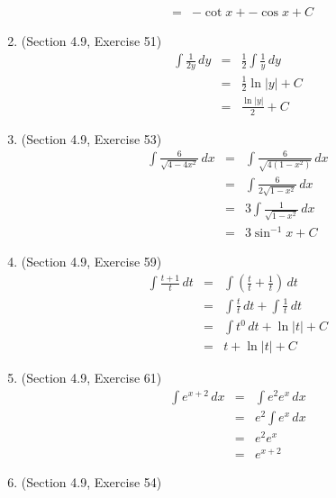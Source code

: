 \documentclass{article}
\begin{document}
\begin{enumerate}
\begin{eqnarray}
                                                    &=& -\cot{x} + -\cos{x} + C
        \end{eqnarray}
    \item (Section 4.9, Exercise 51)
        \begin{eqnarray}
            \int{\frac{1}{2y}}\,dy &=& \frac{1}{2}\int{\frac{1}{y}}\,dy \\
                                   &=& \frac{1}{2}\ln{|y|} + C \\
                                   &=& \frac{\ln{|y|}}{2} + C
        \end{eqnarray}
    \item (Section 4.9, Exercise 53)
        \begin{eqnarray}
            \int{\frac{6}{\sqrt{4 - 4x^2}}}\,dx &=& \int{\frac{6}{\sqrt{4\left(1 - x^2\right)}}}\,dx \\
                                                &=& \int{\frac{6}{2\sqrt{1 - x^2}}}\,dx \\
                                                &=& 3\int{\frac{1}{\sqrt{1 - x^2}}}\,dx \\
                                                &=& 3\sin^{-1}{x} + C
        \end{eqnarray}
    \item (Section 4.9, Exercise 59)
        \begin{eqnarray}
            \int{\frac{t + 1}{t}}\,dt &=& \int{\left(\frac{t}{t} + \frac{1}{t}\right)}\,dt \\
                                      &=& \int{\frac{t}{t}}\,dt + \int{\frac{1}{t}}\,dt \\
                                      &=& \int{t^0}\,dt + \ln{|t|} + C \\
                                      &=& t + \ln{|t|} + C
        \end{eqnarray}
    \item (Section 4.9, Exercise 61)
        \begin{eqnarray}
            \int{e^{x + 2}}\,dx &=& \int{e^2e^x}\,dx \\
                                &=& e^2\int{e^x}\,dx \\
                                &=& e^2e^x \\
                                &=& e^{x + 2}
        \end{eqnarray}
    \item (Section 4.9, Exercise 54)
        \begin{eqnarray}

\end{eqnarray}
\end{enumerate}
\end{document}
